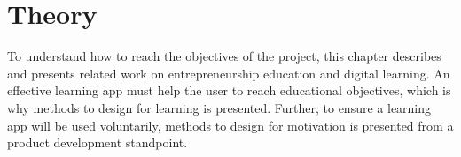 \chapter{Theory}\label{cha:Theory} %

 To understand how to reach the objectives of the project, this chapter describes and presents related work on entrepreneurship education and digital learning. An effective learning app must help the user to reach educational objectives, which is why methods to design for learning is presented. Further, to ensure a learning app will be used voluntarily, methods to design for motivation is presented from a product development standpoint.





 

 

  

  

  

  

  
